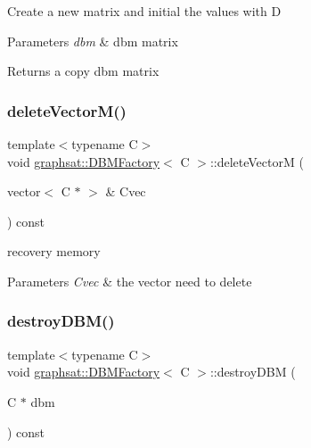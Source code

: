 Create a new matrix and initial the values with D


\begin{DoxyParams}{Parameters}
{\em dbm} & dbm matrix\\
\hline
\end{DoxyParams}
\begin{DoxyReturn}{Returns}
a copy dbm matrix 
\end{DoxyReturn}
\mbox{\label{classgraphsat_1_1_d_b_m_factory_a777b62cf77b24fe8acdcb162ffe46545}} 
\subsubsection{\texorpdfstring{deleteVectorM()}{deleteVectorM()}}
{\footnotesize\ttfamily template$<$typename C$>$ \\
void \mbox{\hyperlink{classgraphsat_1_1_d_b_m_factory}{graphsat\+::\+D\+B\+M\+Factory}}$<$ C $>$\+::delete\+VectorM (\begin{DoxyParamCaption}\item[{vector$<$ C $\ast$ $>$ \&}]{Cvec }\end{DoxyParamCaption}) const\hspace{0.3cm}{\ttfamily [inline]}}

recovery memory


\begin{DoxyParams}{Parameters}
{\em Cvec} & the vector need to delete \\
\hline
\end{DoxyParams}
\mbox{\label{classgraphsat_1_1_d_b_m_factory_a4495ff0e5a07519a5ea06d4eb0e16876}} 
\subsubsection{\texorpdfstring{destroyDBM()}{destroyDBM()}}
{\footnotesize\ttfamily template$<$typename C$>$ \\
void \mbox{\hyperlink{classgraphsat_1_1_d_b_m_factory}{graphsat\+::\+D\+B\+M\+Factory}}$<$ C $>$\+::destroy\+D\+BM (\begin{DoxyParamCaption}\item[{C $\ast$}]{dbm }\end{DoxyParamCaption}) const\hspace{0.3cm}{\ttfamily [inline]}}

